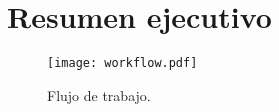\chapter*{Resumen ejecutivo}


\begin{sidewaysfigure}
\texttt{[image: workflow.pdf]}
\caption{Flujo de trabajo.}
\label{fig:flujo_de_trabajo}
\end{sidewaysfigure}